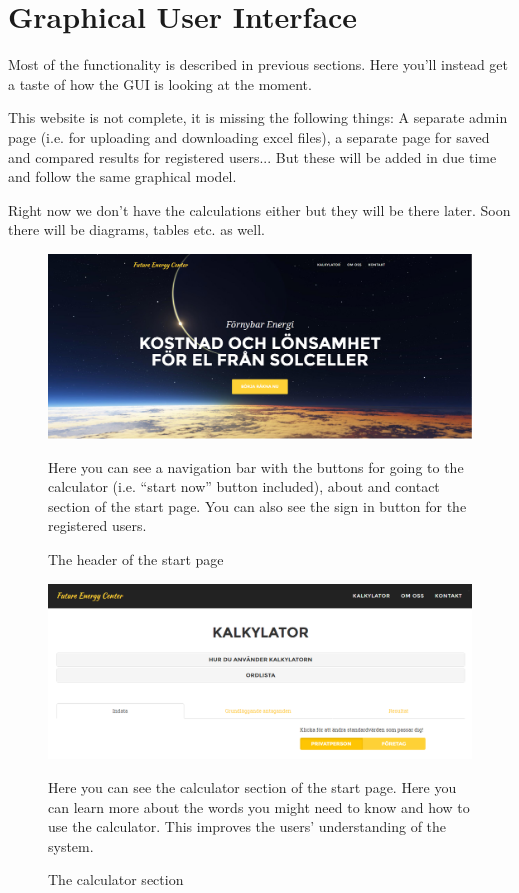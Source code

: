\documentclass[]{article}
\begin{document}
\section{Graphical User Interface}
Most of the functionality is described in previous sections. Here you'll instead get a taste of how the GUI is looking at the moment.

This website is not complete, it is missing the following things: A separate admin page (i.e. for uploading and downloading excel files), a separate page for saved and compared results for registered users... But these will be added in due time and follow the same graphical model.

Right now we don't have the calculations either but they will be there later. Soon there will be diagrams, tables etc. as well.

\begin{figure}[H]
	\includegraphics[width=1.0\linewidth]{pic2}
	\caption{The header of the start page}
	\medskip
	\small
	Here you can see a navigation bar with the buttons for going to the calculator (i.e. “start now” button included), about and contact section of the start page. You can also see the sign in button for the registered users.
	\label{fig:pic2}
\end{figure}
\begin{figure}[H]
	\includegraphics[width=1.0\linewidth]{pic3}
	\caption{The calculator section}
	\medskip
	\small
	Here you can see the calculator section of the start page. Here you can learn more about the words you might need to know and how to use the calculator. This improves the users' understanding of the system.
	\label{fig:pic3}
\end{figure}
\end{document}
